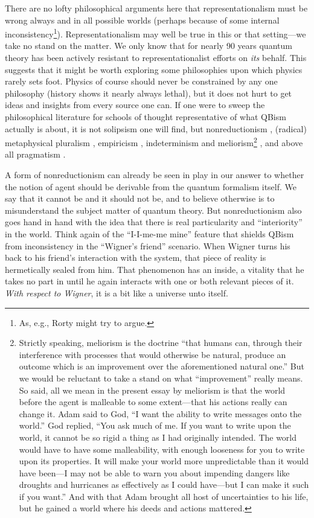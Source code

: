 \documentclass[aps,pra,superscriptaddress,10pt,tightenlines,twocolumn,nofootinbib]{revtex4}
\begin{document}
There are no lofty philosophical arguments here that re\-presentationalism must be wrong always and in all possible worlds (perhaps because of some internal inconsistency\footnote{As, e.g., Rorty \cite{Rorty91} might try to argue.}).  Representationalism may well be true in this or that setting---we take no stand on the matter.  We only know that for nearly 90 years quantum theory has been actively resistant to representationalist efforts on {\it its\/} behalf.  This suggests that it might be worth exploring some philosophies upon which physics rarely sets foot.  Physics of course should never be constrained by any one philosophy (history shows it nearly always lethal), but it does not hurt to get ideas and insights from every source one can.  If one were to sweep the philosophical literature for schools of thought representative of what QBism actually is about, it is not solipsism one will find, but nonreductionism \cite{Dupre93,Cartwright99}, (radical) metaphysical pluralism \cite{James96a,Wahl25}, empiricism \cite{James40,James96b}, indeterminism and meliorism\footnote{Strictly speaking, meliorism is the doctrine ``that humans can, through their interference with processes that would otherwise be natural, produce an outcome which is an improvement over the aforementioned natural one.''  But we would be reluctant to take a stand on what ``improvement'' really means.  So said, all we mean in the present essay by meliorism is that the world before the agent is malleable to some extent---that his actions really can change it.  Adam said to God, ``I want the ability to write messages onto the world.''  God replied, ``You ask much of me.  If you want to write upon the world, it cannot be so rigid a thing as I had originally intended.  The world would have to have some malleability, with enough looseness for you to write upon its properties.  It will make your world more unpredictable than it would have been---I may not be able to warn you about impending dangers like droughts and hurricanes as effectively as I could have---but I can make it such if you want.'' And with that Adam brought all host of uncertainties to his life, but he gained a world where his deeds and actions mattered.} \cite{James1884}, and above all pragmatism \cite{Menand01,Thayer81}.

A form of nonreductionism can already be seen in play in our answer to whether the notion of agent should be derivable from the quantum formalism itself.  We say that it cannot be and it should not be, and to believe otherwise is to misunderstand the subject matter of quantum theory.  But nonreductionism also goes hand in hand with the idea that there is real particularity and ``interiority'' in the world.  Think again of the ``I-I-me-me mine'' feature that shields QBism from inconsistency in the ``Wigner's friend'' scenario.
When Wigner turns his back to his friend's interaction with the system, that piece of reality is hermetically sealed from him.  That phenomenon has an inside, a vitality that he takes no part in until he again interacts with one or both relevant pieces of it.  {\it With respect to Wigner}, it is a bit like a universe unto itself.
\end{document}
